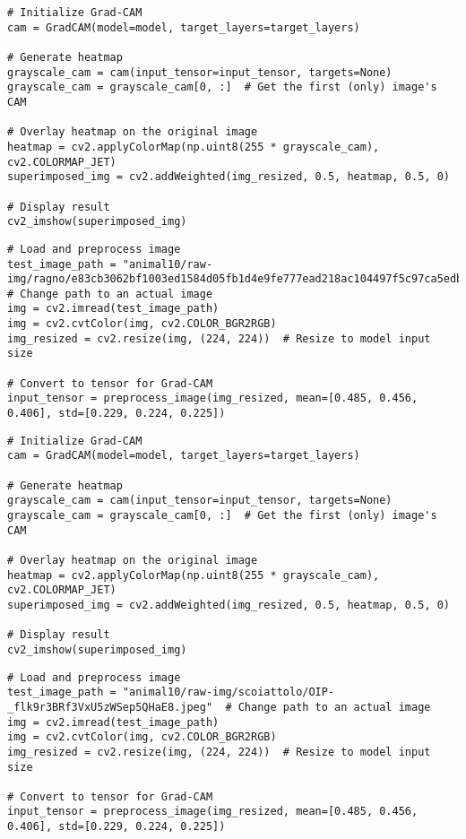 \begin{verbatim}
# Initialize Grad-CAM
cam = GradCAM(model=model, target_layers=target_layers)

# Generate heatmap
grayscale_cam = cam(input_tensor=input_tensor, targets=None)
grayscale_cam = grayscale_cam[0, :]  # Get the first (only) image's CAM

# Overlay heatmap on the original image
heatmap = cv2.applyColorMap(np.uint8(255 * grayscale_cam), cv2.COLORMAP_JET)
superimposed_img = cv2.addWeighted(img_resized, 0.5, heatmap, 0.5, 0)

# Display result
cv2_imshow(superimposed_img)
\end{verbatim}

\begin{verbatim}
# Load and preprocess image
test_image_path = "animal10/raw-img/ragno/e83cb3062bf1003ed1584d05fb1d4e9fe777ead218ac104497f5c97ca5edb3bd_640.jpg"  # Change path to an actual image
img = cv2.imread(test_image_path)
img = cv2.cvtColor(img, cv2.COLOR_BGR2RGB)
img_resized = cv2.resize(img, (224, 224))  # Resize to model input size

# Convert to tensor for Grad-CAM
input_tensor = preprocess_image(img_resized, mean=[0.485, 0.456, 0.406], std=[0.229, 0.224, 0.225])
\end{verbatim}

\begin{verbatim}
# Initialize Grad-CAM
cam = GradCAM(model=model, target_layers=target_layers)

# Generate heatmap
grayscale_cam = cam(input_tensor=input_tensor, targets=None)
grayscale_cam = grayscale_cam[0, :]  # Get the first (only) image's CAM

# Overlay heatmap on the original image
heatmap = cv2.applyColorMap(np.uint8(255 * grayscale_cam), cv2.COLORMAP_JET)
superimposed_img = cv2.addWeighted(img_resized, 0.5, heatmap, 0.5, 0)

# Display result
cv2_imshow(superimposed_img)
\end{verbatim}

\begin{verbatim}
# Load and preprocess image
test_image_path = "animal10/raw-img/scoiattolo/OIP-_flk9r3BRf3VxU5zWSep5QHaE8.jpeg"  # Change path to an actual image
img = cv2.imread(test_image_path)
img = cv2.cvtColor(img, cv2.COLOR_BGR2RGB)
img_resized = cv2.resize(img, (224, 224))  # Resize to model input size

# Convert to tensor for Grad-CAM
input_tensor = preprocess_image(img_resized, mean=[0.485, 0.456, 0.406], std=[0.229, 0.224, 0.225])
\end{verbatim}

